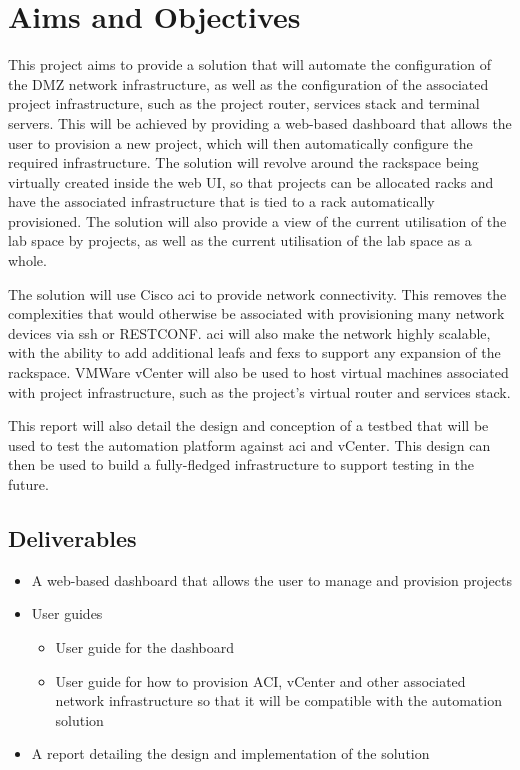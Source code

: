 \section{Aims and Objectives}
\label{intro:aims}

This project aims to provide a solution that will automate the
configuration of the DMZ network infrastructure, as well as the configuration of the associated project infrastructure, such as the project router, services stack and terminal servers. This will be achieved by providing a web-based dashboard that allows the user to provision a new project, which will then automatically configure the required infrastructure. The solution will revolve around the rackspace being virtually created inside the web UI, so that projects can be allocated racks and have the associated infrastructure that is tied to a rack automatically provisioned. The solution will also provide a view of the current utilisation of the lab space by projects, as well as the current utilisation of the lab space as a whole.

The solution will use Cisco \gls{aci} to provide network connectivity. This removes the complexities that would otherwise be associated with provisioning many network devices via \gls{ssh} or RESTCONF. \gls{aci} will also make the network highly scalable, with the ability to add additional leafs and \gls{fex}s to support any expansion of the rackspace. VMWare vCenter will also be used to host virtual machines associated with project infrastructure, such as the project's virtual router and services stack.

This report will also detail the design and conception of a testbed that will be used to test the automation platform against \gls{aci} and vCenter. This design can then be used to build a fully-fledged infrastructure to support testing in the future.
\subsection{Deliverables}
\label{intro:aims:deliverables}

\begin{itemize}
    \item A web-based dashboard that allows the user to manage and provision projects
    \item User guides
          \begin{itemize}
              \item User guide for the dashboard
              \item User guide for how to provision ACI, vCenter and other associated network infrastructure so that it will be compatible with the automation solution
          \end{itemize}
    \item A report detailing the design and implementation of the solution
\end{itemize}

